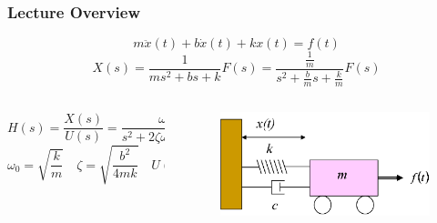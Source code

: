 \documentclass[aspectratio=169,handout]{beamer}
\begin{document}
\section*{}

\begin{frame}
	\frametitle{Lecture Overview}
	\[
		m \ddot{x}(t) + b \dot{x}(t) + k x(t) = f(t)
	\]
	\[
		X(s) = \frac{1}{m s^2 + b s + k} F(s) 
		= \frac{\frac{1}{m}}{s^2 + \frac{b}{m} s + \frac{k}{m}} F(s)
	\]
	\begin{columns}
		\begin{column}{0.5\textwidth}
			\[
				H(s) = \frac{X(s)}{U(s)}
				= \frac{
					\omega_0^2
				}{
					s^2 + 2 \zeta \omega_0 s + \omega_0^2
				}
			\]		
	\[
		\omega_0 = \sqrt{\frac{k}{m}}
		\quad
		\zeta = \sqrt{\frac{b^2}{4 m k}}
		\quad
		U(s) = \frac{1}{k} F(s)
	\]
		\end{column}
		\begin{column}{0.25 \textwidth}
			\begin{figure}[]
				\includegraphics[width=\textwidth]{Images/SpringMassDamper_cartSystem.png}
			\end{figure}
		\end{column}
	\end{columns}
\end{frame}

% 	
% 	
\end{document}
